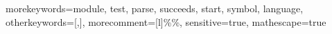  {
	morekeywords={module, test, parse, succeeds, start, symbol, language},
	otherkeywords={[,]},
	morecomment=[l]{\%\%},
	sensitive=true,
	mathescape=true
}

\newcommand{\sptcode}[1]{\lstinline[language=SDF,basicstyle=\lstinlinestyle,breaklines=false]{#1}}
\newcommand{\sptcodebl}[1]{\lstinline[language=SDF,basicstyle=\lstinlinestyle,breaklines=true]{#1}}
\newcommand{\SPT}{\langname{SPT}}
